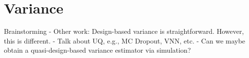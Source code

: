 \section{Variance}

\begin{frame}{Brainstorming}
    - Other work: Design-based variance is straightforward. However, this is different. 
    - Talk about UQ, e.g., MC Dropout, VNN, etc. 
    - Can we maybe obtain a quasi-design-based variance estimator via simulation?
\end{frame}